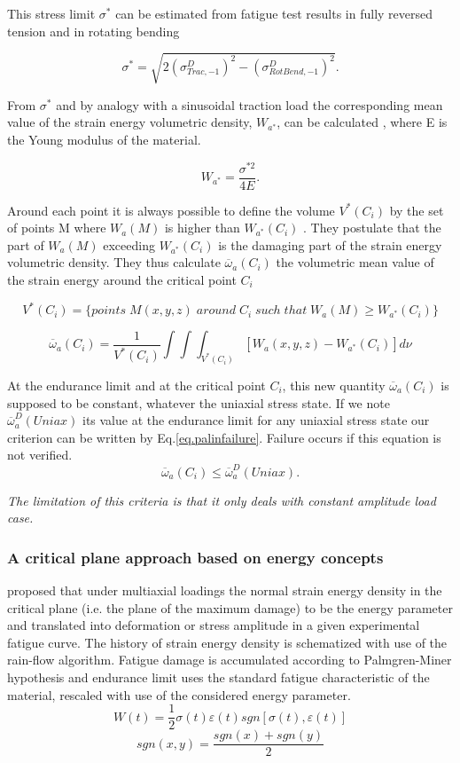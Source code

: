 This stress limit $\sigma^*$ can be estimated from
fatigue test results in fully reversed tension and in rotating
bending

$$\sigma^*=\sqrt{2(\sigma_{Trac,-1}^D)^2-(\sigma_{RotBend,-1}^D)^2}.$$

From $\sigma^*$ and by analogy with a sinusoidal traction load the corresponding mean value
of the strain energy volumetric density, $W_{a^*}$, can be calculated , where E is the
Young modulus of the material.

$$W_{a^*}=\frac{\sigma^{*2}}{4E}.$$

Around each point it is always possible to define
the volume $V^* (C_i)$ by the set of points M where $W_a (M)$ is higher than $W_{a^*} (C_i)$
. They postulate that the part of $W_a (M)$ exceeding $W_{a^*} (C_i)$ is the damaging part
of the strain energy volumetric density. They thus calculate $\overline{\omega}_a(C_i)$ 
the volumetric mean value of the strain energy around the critical point $C_i$

$$V^*(C_i)=\lbrace points\; M(x,y,z) \;around\; C_i \;such\; that \;W_a(M)\geqslant W_{a^*}(C_i) \rbrace$$

$$\overline{\omega}_a(C_i)=\frac{1}{V^*(C_i)}\int\int\int_{V^*(C_i)}^{}[W_a(x,y,z)-W_{a^*}(C_i)]d\nu$$

At the endurance limit and at the critical point $C_i$, this new quantity $\overline{\omega}_a(C_i)$ is
supposed to be constant, whatever the uniaxial stress state. If we note $\overline{\omega}_a^D(Uniax)$ its
value at the endurance limit for any uniaxial stress state our criterion can be written by
Eq.\ref{eq.palinfailure}. Failure occurs if this equation is not verified.
\begin{equation}
\overline{\omega}_a(C_i)\leqslant\overline{\omega}_a^D(Uniax).
\label{eq.palinfailure}
\end{equation}

\textit{The limitation of this criteria is that it only deals with constant amplitude load case.}

\subsubsection{A critical plane approach based on energy concepts}


\cite{lagoda1999critical} proposed that under multiaxial loadings the normal strain energy density in the critical plane (i.e. the plane of the maximum damage) to be the energy parameter and translated into deformation or stress amplitude in a given experimental fatigue curve. The history of strain energy density is schematized with use of the rain-flow algorithm. %
Fatigue damage is accumulated according to Palmgren-Miner hypothesis and endurance limit uses the standard fatigue characteristic of the material, rescaled with use of the considered energy parameter. 
\begin{equation}W(t)=\frac{1}{2}\sigma(t)\varepsilon(t)sgn[\sigma(t),\varepsilon(t)]\label{eq.lagodaWt}
\end{equation}
$$sgn(x,y)=\frac{sgn(x)+sgn(y)}{2}$$

